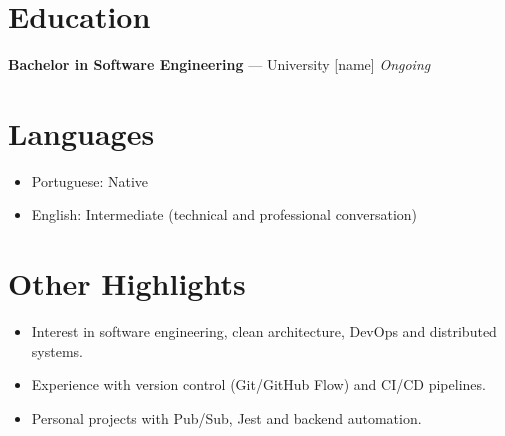 \documentclass[a4paper,10pt]{article}
\begin{document}
\section*{Education}
\textbf{Bachelor in Software Engineering} — University [name] \hfill \textit{Ongoing}

\section*{Languages}
\begin{itemize}[leftmargin=1.2em, noitemsep, topsep=3pt]
    \item Portuguese: Native
    \item English: Intermediate (technical and professional conversation)
\end{itemize}

\section*{Other Highlights}
\begin{itemize}[leftmargin=1.2em, noitemsep, topsep=3pt]
    \item Interest in software engineering, clean architecture, DevOps and distributed systems.
    \item Experience with version control (Git/GitHub Flow) and CI/CD pipelines.
    \item Personal projects with Pub/Sub, Jest and backend automation.
\end{itemize}
\end{document}

